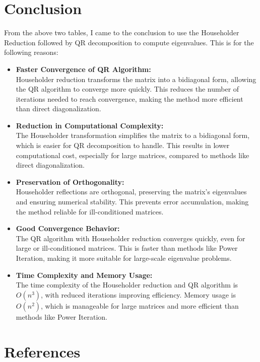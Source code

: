 \documentclass[journal]{IEEEtran}
\begin{document}
\section*{Conclusion}
From the above two tables, I came to the conclusion to use the Householder Reduction followed by QR decomposition to compute eigenvalues. This is for the following reasons:
\begin{itemize}
    \item \textbf{Faster Convergence of QR Algorithm:} \\
    Householder reduction transforms the matrix into a bidiagonal form, allowing the QR algorithm to converge more quickly. This reduces the number of iterations needed to reach convergence, making the method more efficient than direct diagonalization.

    \item \textbf{Reduction in Computational Complexity:} \\
    The Householder transformation simplifies the matrix to a bidiagonal form, which is easier for QR decomposition to handle. This results in lower computational cost, especially for large matrices, compared to methods like direct diagonalization.

    \item \textbf{Preservation of Orthogonality:} \\
    Householder reflections are orthogonal, preserving the matrix's eigenvalues and ensuring numerical stability. This prevents error accumulation, making the method reliable for ill-conditioned matrices.

    \item \textbf{Good Convergence Behavior:} \\
    The QR algorithm with Householder reduction converges quickly, even for large or ill-conditioned matrices. This is faster than methods like Power Iteration, making it more suitable for large-scale eigenvalue problems.

    \item \textbf{Time Complexity and Memory Usage:} \\
    The time complexity of the Householder reduction and QR algorithm is \(O(n^3)\), with reduced iterations improving efficiency. Memory usage is \(O(n^2)\), which is manageable for large matrices and more efficient than methods like Power Iteration.
\end{itemize}

\section*{References}
\end{document}
